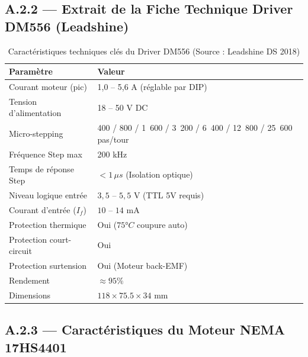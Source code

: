 \subsection{A.2.2 — Extrait de la Fiche Technique Driver DM556 (Leadshine)}

\begin{table}[htbp]
\centering
\renewcommand{\arraystretch}{1.3}
\begin{tabular}{|l|l|}
\hline
\rowcolor{macouleur!20}
\textbf{Paramètre} & \textbf{Valeur} \\
\hline
Courant moteur (pic) & 1{,}0 -- 5{,}6 A (réglable par DIP) \\
\hline
Tension d'alimentation & 18 -- 50 V DC \\
\hline
Micro-stepping & 400 / 800 / 1~600 / 3~200 / 6~400 / 12~800 / 25~600 pas/tour \\
\hline
Fréquence Step max & 200 kHz \\
\hline
Temps de réponse Step & $< 1\,\mu s$ (Isolation optique) \\
\hline
Niveau logique entrée & $3{,}5$ -- $5{,}5$ V (TTL 5V requis) \\
\hline
Courant d'entrée ($I_f$) & $10$ -- $14$ mA \\
\hline
Protection thermique & Oui ($75°C$ coupure auto) \\
\hline
Protection court-circuit & Oui \\
\hline
Protection surtension & Oui (Moteur back-EMF) \\
\hline
Rendement & $\approx 95\%$ \\
\hline
Dimensions & $118 \times 75.5 \times 34$ mm \\
\hline
\end{tabular}
\caption{Caractéristiques techniques clés du Driver DM556 (Source : Leadshine DS 2018)}
\label{tab:dm556_specs}
\end{table}

\subsection{A.2.3 — Caractéristiques du Moteur NEMA 17HS4401}

